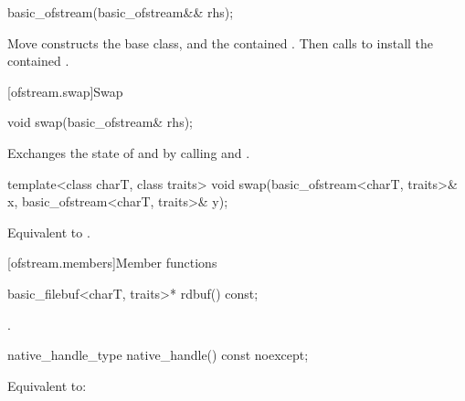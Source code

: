 %
\begin{itemdecl}
basic_ofstream(basic_ofstream&& rhs);
\end{itemdecl}

\begin{itemdescr}
\pnum
\effects
Move constructs the base class, and the contained .
Then calls 
to install the contained .
\end{itemdescr}

[ofstream.swap]{Swap}

%
\begin{itemdecl}
void swap(basic_ofstream& rhs);
\end{itemdecl}

\begin{itemdescr}
\pnum
\effects
Exchanges the state of 
and  by calling
 and
.
\end{itemdescr}

%
\begin{itemdecl}
template<class charT, class traits>
  void swap(basic_ofstream<charT, traits>& x, basic_ofstream<charT, traits>& y);
\end{itemdecl}

\begin{itemdescr}
\pnum
\effects
Equivalent to .
\end{itemdescr}

[ofstream.members]{Member functions}

%
\begin{itemdecl}
basic_filebuf<charT, traits>* rdbuf() const;
\end{itemdecl}

\begin{itemdescr}
\pnum
\returns
{}.
\end{itemdescr}

%
\begin{itemdecl}
native_handle_type native_handle() const noexcept;
\end{itemdecl}

\begin{itemdescr}
\pnum
\effects
Equivalent to: 
\end{itemdescr}


